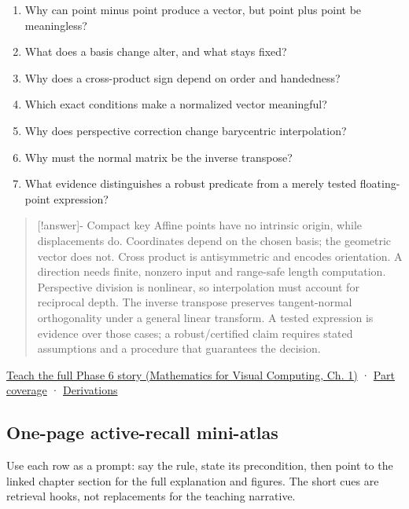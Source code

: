 \begin{enumerate}
\def\labelenumi{\arabic{enumi}.}
\tightlist
\item
  Why can point minus point produce a vector, but point plus point be meaningless?
\item
  What does a basis change alter, and what stays fixed?
\item
  Why does a cross-product sign depend on order and handedness?
\item
  Which exact conditions make a normalized vector meaningful?
\item
  Why does perspective correction change barycentric interpolation?
\item
  Why must the normal matrix be the inverse transpose?
\item
  What evidence distinguishes a robust predicate from a merely tested floating-point expression?
\end{enumerate}

\begin{quote}
{[}!answer{]}- Compact key Affine points have no intrinsic origin, while displacements do. Coordinates depend on the chosen basis; the geometric vector does not. Cross product is antisymmetric and encodes orientation. A direction needs finite, nonzero input and range-safe length computation. Perspective division is nonlinear, so interpolation must account for reciprocal depth. The inverse transpose preserves tangent-normal orthogonality under a general linear transform. A tested expression is evidence over those cases; a robust/certified claim requires stated assumptions and a procedure that guarantees the decision.
\end{quote}

\href{../02-Mathematics-for-Visual-Computing/main.pdf\#nameddest=01-foundations-i-ch017-the-panel-gives-us-a-reason-to-learn}{Teach the full Phase 6 story (Mathematics for Visual Computing, Ch. 1)} · \hyperref[appendix-fd090d982a15-phase-6---parts-501-600]{Part coverage} · \hyperref[02-foundations-ii-ch039-phase-6---geometry-reconstruction-proofs]{Derivations}

\subsection{One-page active-recall mini-atlas}\label{appendix-38d9c8aca357-one-page-active-recall-mini-atlas}

Use each row as a prompt: say the rule, state its precondition, then point to the linked chapter section for the full explanation and figures. The short cues are retrieval hooks, not replacements for the teaching narrative.

